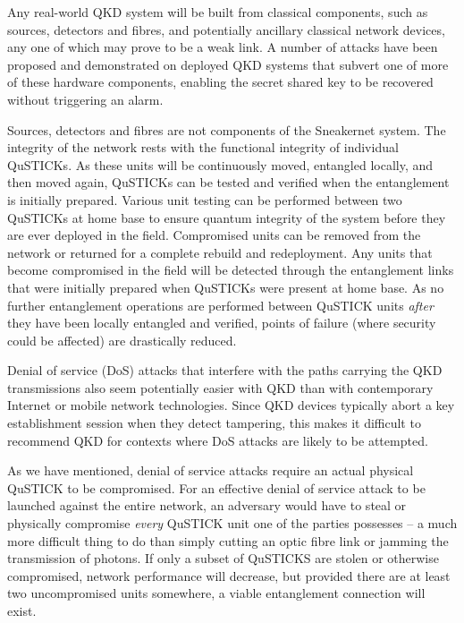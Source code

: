 \documentclass[twocolumn, aps, rmp, amsmath, amssymb, nofootinbib, superscriptaddress, longbibliography, floatfix, table-of-contents, eqsecnum]{revtex4-2}
\begin{document}
Any real-world QKD system will be built from classical components, such as sources, detectors and fibres, and potentially ancillary classical network devices, any one of which may prove to be a weak link. A number of attacks have been proposed and demonstrated on deployed QKD systems that subvert one of more of these hardware components, enabling the secret shared key to be recovered without triggering an alarm.

Sources, detectors and fibres are not components of the Sneakernet system. The integrity of the network rests with the functional integrity of individual QuSTICKs. As these units will be continuously moved, entangled locally, and then moved again, QuSTICKs can be tested and verified when the entanglement is initially prepared. Various unit testing can be performed between two QuSTICKs at home base to ensure quantum integrity of the system before they are ever deployed in the field. Compromised units can be removed from the network or returned for a complete rebuild and redeployment. Any units that become compromised in the field will be detected through the entanglement links that were initially prepared when QuSTICKs were present at home base. As no further entanglement operations are performed between QuSTICK units \textit{after} they have been locally entangled and verified, points of failure (where security could be affected) are drastically reduced. 

Denial of service (DoS) attacks that interfere with the paths carrying the QKD transmissions also seem potentially easier with QKD than with contemporary Internet or mobile network technologies. Since QKD devices typically abort a key establishment session when they detect tampering, this makes it difficult to recommend QKD for contexts where DoS attacks are likely to be attempted.

As we have mentioned, denial of service attacks require an actual physical QuSTICK to be compromised. For an effective denial of service attack to be launched against the entire network, an adversary would have to steal or physically compromise \textit{every} QuSTICK unit one of the parties possesses -- a much more difficult thing to do than simply cutting an optic fibre link or jamming the transmission of photons. If only a subset of QuSTICKS are stolen or otherwise compromised, network performance will decrease, but provided there are at least two uncompromised units somewhere, a viable entanglement connection will exist. 
\end{document}
